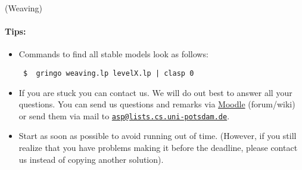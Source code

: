 \documentclass[a4paper,12pt]{article}
\begin{document}
\begin{PraktikumsAufgabe}{1}{(Weaving)}
\paragraph{Tips:}
\begin{itemize}
\item Commands to find all stable models look as follows:%
\vspace{-1.5mm}%
\begin{verbatim}
 $  gringo weaving.lp levelX.lp | clasp 0
\end{verbatim}
\vspace{-1mm}
%
\item If you are stuck you can contact us. We will do out best to answer all your questions.
      You can send us questions and remarks via 
      \href{http://moodle.cs.uni-potsdam.de/course/view.php?id=39}{Moodle} (forum/wiki)
      or send them via mail to 
      \href{mailto:asp@lists.cs.uni-potsdam.de}{\texttt{asp@lists.cs.uni-potsdam.de}}.
\item Start as soon as possible to avoid running out of time.
      (However, if you still realize that you have problems making it before the deadline,
       please contact us instead of copying another solution).
\end{itemize}

\end{PraktikumsAufgabe}
\end{document}

